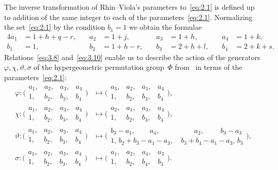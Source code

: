 \documentclass[a4paper,twoside]{article}
\numberwithin{equation}{section}
\renewcommand{\[}{\lfloor}
\renewcommand{\]}{\rfloor}
\newcommand{\<}{\langle}
\renewcommand{\>}{\rangle}
\renewcommand{\phi}{\varphi}
\newcommand{\vt}{\vartheta}
\begin{document}
The inverse transformation of Rhin--Viola's parameters
to~\eqref{eq:2.1} is defined up to addition of the same
integer to each of the parameters~\eqref{eq:2.1}.
Normalizing the set~\eqref{eq:2.1} by the condition $b_1=1$
we obtain the formulae
\begin{equation}
\begin{alignedat}{4}{4}
a_1&=1+h+q-r, \quad&
a_2&=1+j, \quad&
a_3&=1+h, \quad&
a_4&=1+k,
\\
b_1&=1, \quad&
b_2&=1+h-r, \quad&
b_3&=2+h+l, \quad&
b_4&=2+k+s.
\end{alignedat}
\label{eq:3.10}
\end{equation}
Relations~\eqref{eq:3.8} and~\eqref{eq:3.10} enable us
to describe the action of the generators $\phi,\chi,\vt,\sigma$
of the hypergeometric permutation group~$\varPhi$
from~\cite{RV3} in terms of the parameters~\eqref{eq:2.1}:
\begin{equation}
\begin{aligned}
\phi\colon\biggl(\begin{array}{rrrr}
a_1, & a_2, & a_3, & a_4 \\
  1, & b_2, & b_3, & b_4
\end{array}\biggr)
&\mapsto\biggl(\begin{array}{rrrr}
a_3, & a_2, & a_1, & a_4 \\
  1, & b_2, & b_3, & b_4
\end{array}\biggr),
\\
\chi\colon\biggl(\begin{array}{rrrr}
a_1, & a_2, & a_3, & a_4 \\
  1, & b_2, & b_3, & b_4
\end{array}\biggr)
&\mapsto\biggl(\begin{array}{rrrr}
a_2, & a_1, & a_3, & a_4 \\
  1, & b_2, & b_3, & b_4
\end{array}\biggr),
\\
\vt\colon\biggl(\begin{array}{rrrr}
a_1, & a_2, & a_3, & a_4 \\
  1, & b_2, & b_3, & b_4
\end{array}\biggr)
&\mapsto\biggl(\begin{array}{rr}
b_3-a_1, \qquad a_4, \qquad & \qquad a_2, \;\qquad b_3-a_3 \\
      1, \, b_2+b_3-a_1-a_3, & \, b_3+b_4-a_1-a_3, \, b_3
\end{array}\biggr),
\\
\sigma\colon\biggl(\begin{array}{rrrr}
a_1, & a_2, & a_3, & a_4 \\
  1, & b_2, & b_3, & b_4
\end{array}\biggr)
&\mapsto\biggl(\begin{array}{rrrr}
a_1, & a_2, & a_4, & a_3 \\
  1, & b_2, & b_4, & b_3
\end{array}\biggr).
\end{aligned}
\label{eq:3.11}
\end{equation}
\end{document}
